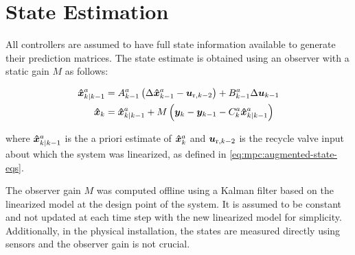 \section{State Estimation}
\label{sec:mpc:estimation}

All controllers are assumed to have full state information available to generate their prediction matrices.
The state estimate is obtained using an observer with a static gain $M$ as follows:

\begin{equation}
  \begin{split}
    \bm{\hat{x}}_{k|k-1}^a & = A_{k-1}^a \left(\Delta \bm{\hat{x}}_{k-1}^a - \bm{u}_{\text{r},k-2}\right) + B_{k-1}^a \Delta \bm{u}_{k-1}\\
    \bm{\hat{x}}_{k} & = \bm{\hat{x}}_{k|k-1}^a + M \left( \bm{y}_k-\bm{y}_{k-1} - C_k^a \bm{\hat{x}}_{k|k-1}^a \right)
  \end{split}
\end{equation}

\noindent where $\bm{\hat{x}}_{k|k-1}^a$ is the a priori estimate of $\bm{\hat{x}}_k^a$ and $\bm{u}_{\text{r},k-2}$ is the recycle valve input about which the system was linearized, as defined in \eqref{eq:mpc:augmented-state-eqs}.

The observer gain $M$ was computed offline using a Kalman filter based on the linearized model at the design point of the system.
It is assumed to be constant and not updated at each time step with the new linearized model for simplicity.
Additionally, in the physical installation, the states are measured directly using sensors and the observer gain is not crucial.

